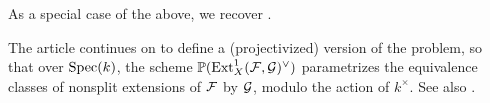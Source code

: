 \begin{remark}
As a special case of the above, we recover .
\end{remark}

\begin{remark}
	The article \cite{lange-universal-extensions} continues on to define a (projectivized) version of the problem, so that over $\operatorname{Spec}(k)$, the scheme $\mathbb{P}(\operatorname{Ext}^1_X(\mathcal{F},\mathcal{G})^\vee)$ parametrizes the equivalence classes of nonsplit extensions of $\mathcal{F}$ by $\mathcal{G}$, modulo the action of $k^{\times}$. See also \cite[Example 2.1.12]{huybrechts-lehn-sheaves}.
\end{remark}

